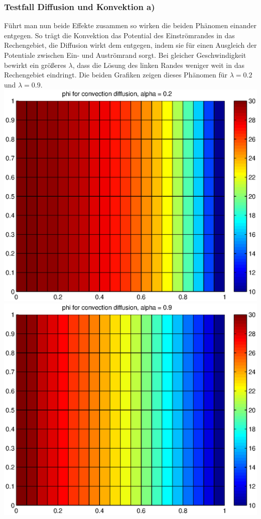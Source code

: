\documentclass{article}
\begin{document}
\subsubsection{Testfall Diffusion und Konvektion a)}
Führt man nun beide Effekte zusammen so wirken die beiden Phänomen einander entgegen. So trägt die Konvektion das Potential des
Einströmrandes in das Rechengebiet, die Diffusion wirkt dem entgegen, indem sie für einen Ausgleich der Potentiale
zwischen Ein- und Auströmrand sorgt. Bei gleicher Geschwindigkeit bewirkt ein größeres $\lambda$, dass die Lösung des linken Randes weniger weit
in das Rechengebiet eindringt. Die beiden Grafiken zeigen dieses Phänomen für $\lambda=0.2$ und $\lambda = 0.9$.\\
\includegraphics[scale=0.4]{test/5conv/alpha0.2.eps}
\includegraphics[scale=0.4]{test/5conv/alpha0.9.eps}
\end{document}
